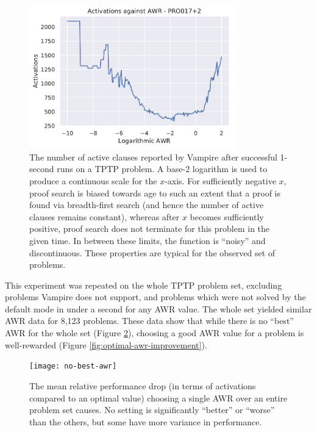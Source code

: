 \documentclass{llncs}
\begin{document}
\begin{figure}
	\centering
	\includegraphics[width=0.8\textwidth]{example-optimal-awr}
	\caption{
The number of active clauses reported by Vampire after successful 1-second runs on a TPTP problem.
A base-2 logarithm is used to produce a continuous scale for the \(x\)-axis.
For sufficiently negative \(x\), proof search is biased towards age to such an extent that a proof is found via breadth-first search (and hence the number of active clauses remains constant), whereas after \(x\) becomes sufficiently positive, proof search does not terminate for this problem in the given time.
In between these limits, the function is ``noisy'' and discontinuous.
These properties are typical for the observed set of problems.
}
	\label{fig:example-optimal-awr}
\end{figure}

This experiment was repeated on the whole TPTP problem set, excluding problems Vampire does not support, and problems which were not solved by the default mode in under a second for any AWR value.
The whole set yielded similar AWR data for 8,123 problems.
These data show that while there is no ``best'' AWR for the whole set (Figure \ref{fig:no-best-awr}), choosing a good AWR value for a problem is well-rewarded (Figure \ref{fig:optimal-awr-improvement}).

\begin{figure}
	\centering
	\texttt{[image: no-best-awr]}
	\caption{The mean relative performance drop (in terms of activations compared to an optimal value) choosing a single AWR over an entire problem set causes. No setting is significantly ``better'' or ``worse'' than the others, but some have more variance in performance.}
	\label{fig:no-best-awr}
\end{figure}
\end{document}
